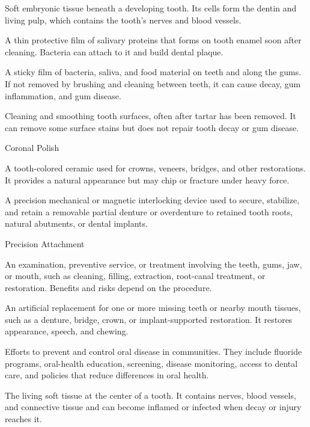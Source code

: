 Soft embryonic tissue beneath a developing tooth. Its cells form the dentin and living pulp, which contains the tooth’s nerves and blood vessels.

 A thin protective film of salivary proteins that forms on tooth enamel soon after cleaning. Bacteria can attach to it and build dental plaque.

 A sticky film of bacteria, saliva, and food material on teeth and along the gums. If not removed by brushing and cleaning between teeth, it can cause decay, gum inflammation, and gum disease.

 Cleaning and smoothing tooth surfaces, often after tartar has been removed. It can remove some surface stains but does not repair tooth decay or gum disease.

\synonyms
Coronal Polish

 A tooth-colored ceramic used for crowns, veneers, bridges, and other restorations. It provides a natural appearance but may chip or fracture under heavy force.

 A precision mechanical or magnetic interlocking device used to secure, stabilize, and retain a removable partial denture or overdenture to retained tooth roots, natural abutments, or dental implants.

\synonyms
Precision Attachment

 An examination, preventive service, or treatment involving the teeth, gums, jaw, or mouth, such as cleaning, filling, extraction, root-canal treatment, or restoration. Benefits and risks depend on the procedure.

 An artificial replacement for one or more missing teeth or nearby mouth tissues, such as a denture, bridge, crown, or implant-supported restoration. It restores appearance, speech, and chewing.

 Efforts to prevent and control oral disease in communities. They include fluoride programs, oral-health education, screening, disease monitoring, access to dental care, and policies that reduce differences in oral health.

 The living soft tissue at the center of a tooth. It contains nerves, blood vessels, and connective tissue and can become inflamed or infected when decay or injury reaches it.

